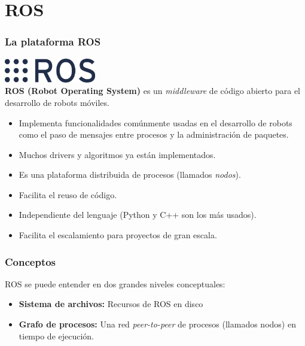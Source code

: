 \documentclass[10pt,spanish,aspectratio=1610]{beamer}
\begin{document}
\section{ROS}
\begin{frame}\frametitle{La plataforma ROS}
  \includegraphics[width=0.3\textwidth]{Figures/Ros_logo.png}
  \[\]
  \textbf{ROS (Robot Operating System) } es un \textit{middleware} de código abierto para el desarrollo de robots móviles.
  \begin{itemize}
  \item Implementa funcionalidades comúnmente usadas en el desarrollo de robots como el paso de mensajes entre procesos y la administración de paquetes.
  \item Muchos drivers y algoritmos ya están implementados.
  \item Es una plataforma distribuida de procesos (llamados \textit{nodos}).
  \item Facilita el reuso de código.
  \item Independiente del lenguaje (Python y C++ son los más usados).
  \item Facilita el escalamiento para proyectos de gran escala. 
  \end{itemize}
\end{frame}

\begin{frame}\frametitle{Conceptos}
  ROS se puede entender en dos grandes niveles conceptuales:
  \begin{itemize}
  \item \textbf{Sistema de archivos:} Recursos de ROS en disco
  \item \textbf{Grafo de procesos:} Una red \textit{peer-to-peer} de procesos (llamados nodos) en tiempo de ejecución.
  \end{itemize}
\end{frame}
\end{document}
